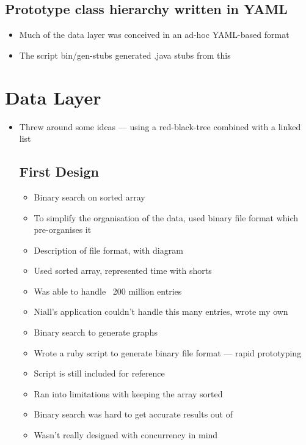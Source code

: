 \subsection{Prototype class hierarchy written in YAML}
\begin{itemize}
\item Much of the data layer was conceived in an ad-hoc YAML-based format\cite{YAML}
\item The script bin/gen-stubs generated .java stubs from this\cite{Stubs}
\end{itemize}

\section{Data Layer}
\begin{itemize}
\item Threw around some ideas --- using a red-black-tree combined with a linked list
\subsection{First Design}
\begin{itemize}
\item Binary search on sorted array\cite{Data.java}
\item To simplify the organisation of the data, used binary file format which pre-organises it
\item Description of file format, with diagram
\item Used sorted array, represented time with shorts
\item Was able to handle ~200 million entries
\item Niall's application couldn't handle this many entries, wrote my own
\item Binary search to generate graphs
\item Wrote a ruby script to generate binary file format --- rapid prototyping
\item Script is still included for reference
\item Ran into limitations with keeping the array sorted
\item Binary search was hard to get accurate results out of
\item Wasn't really designed with concurrency in mind
\end{itemize}

\end{itemize}
